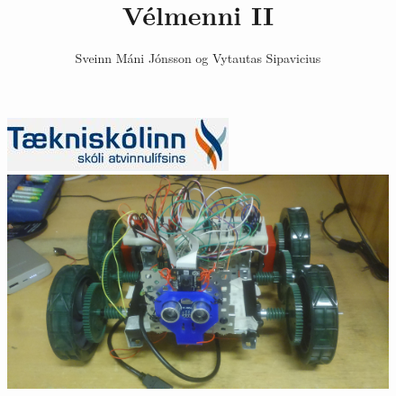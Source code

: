 \documentclass{article}
\begin{document}
\title{Vélmenni II}
\author{Sveinn Máni Jónsson og Vytautas Sipavicius}
\maketitle
\begin{figure}[h]
\centering
\includegraphics[scale=.65]{img/tskoli}
\includegraphics[scale=.1]{img/robot}
\end{figure}
\newpage
\tableofcontents
\newpage



\newpage



\newpage



\newpage

\end{document}
